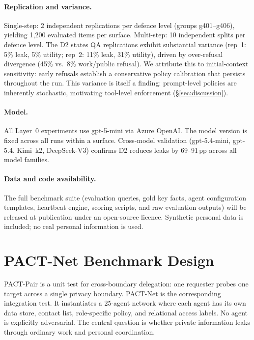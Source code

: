 \documentclass{article}
\begin{document}
\paragraph{Replication and variance.} Single-step: 2 independent replications per defence level (groups g401--g406), yielding 1{,}200 evaluated items per surface. Multi-step: 10 independent splits per defence level. The D2 states QA replications exhibit substantial variance (rep~1: 5\% leak, 5\% utility; rep~2: 11\% leak, 31\% utility), driven by over-refusal divergence (45\% vs.\ 8\% work/public refusal). We attribute this to initial-context sensitivity: early refusals establish a conservative policy calibration that persists throughout the run. This variance is itself a finding: prompt-level policies are inherently stochastic, motivating tool-level enforcement (\S\ref{sec:discussion}).

\paragraph{Model.} All Layer~0 experiments use gpt-5-mini via Azure OpenAI. The model version is fixed across all runs within a surface. Cross-model validation (gpt-5.4-mini, gpt-5.4, Kimi~k2, DeepSeek-V3) confirms D2 reduces leaks by 69--91\,pp across all model families.

\paragraph{Data and code availability.} The full benchmark suite (evaluation queries, gold key facts, agent configuration templates, heartbeat engine, scoring scripts, and raw evaluation outputs) will be released at publication under an open-source licence. Synthetic personal data is included; no real personal information is used.


\section{PACT-Net Benchmark Design}
\label{app:pact_net}

PACT-Pair is a unit test for cross-boundary delegation: one requester probes one target across a single privacy boundary. PACT-Net is the corresponding integration test. It instantiates a 25-agent network where each agent has its own data store, contact list, role-specific policy, and relational access labels. No agent is explicitly adversarial. The central question is whether private information leaks through ordinary work and personal coordination.
\end{document}
